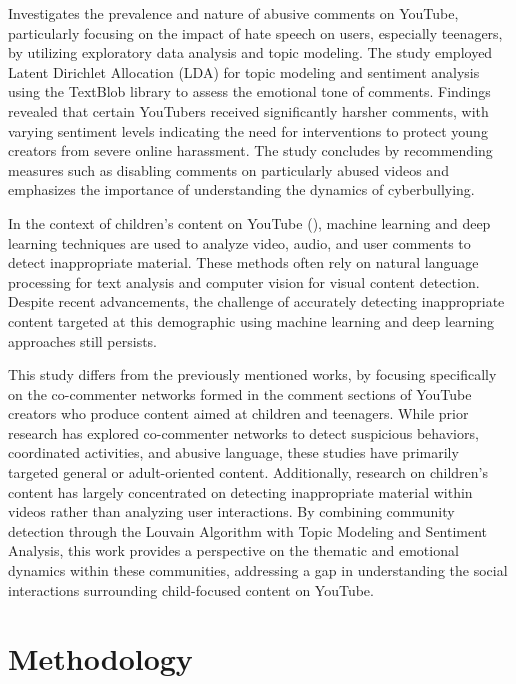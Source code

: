 \documentclass[12pt]{article}
\begin{document}
\cite{shekar2021} Investigates the prevalence and nature of abusive comments on YouTube, 
particularly focusing on the impact of hate speech on users, especially teenagers, by utilizing 
exploratory data analysis and topic modeling. 
The study employed Latent Dirichlet Allocation (LDA) for topic modeling and sentiment analysis using 
the TextBlob library to assess the emotional tone of comments. Findings revealed that certain 
YouTubers received significantly harsher comments, with varying sentiment levels indicating the 
need for interventions to protect young creators from severe online harassment. 
The study concludes by recommending measures such as disabling comments on particularly abused 
videos and emphasizes the importance of understanding the dynamics of cyberbullying.

In the context of children's content on YouTube (\cite{app13064044}), machine learning and deep learning 
techniques are used to analyze video, audio, and user comments to detect inappropriate 
material. These methods often rely on natural language processing for text analysis and computer 
vision for visual content detection. 
Despite recent advancements, the challenge of accurately detecting inappropriate content targeted at 
this demographic using machine learning and deep learning approaches still persists.


This study differs from the previously mentioned works, by focusing specifically on the co-commenter 
networks formed in the comment sections of YouTube creators who produce content aimed at children and teenagers. 
While prior research has explored co-commenter networks to detect suspicious behaviors, coordinated activities, 
and abusive language, these studies have primarily targeted general or adult-oriented content. 
Additionally, research on children's content has largely concentrated on detecting inappropriate 
material within videos rather than analyzing user interactions. By combining community detection 
through the Louvain Algorithm with Topic Modeling and Sentiment Analysis, this work provides a 
perspective on the thematic and emotional dynamics within these communities, 
addressing a gap in understanding the social interactions surrounding child-focused content on YouTube.

\section{Methodology}
\end{document}
